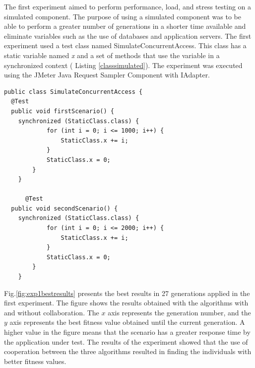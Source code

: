 \documentclass[espaco=umemeio,chapter=TITLE,twoside,openright]{abnt}
\begin{document}
The first experiment aimed to perform performance, load, and stress testing on a simulated component. The purpose of using a simulated component was to be able to perform a greater number of generations in a shorter time available and eliminate variables such as the use of databases and application servers. The first experiment used a test class  named SimulateConcurrentAccess. This class has a static variable named \textit{x} and a set of methods that use the variable in a synchronized context ( Listing \ref{classsimulated}). The experiment was executed using the JMeter Java Request Sampler Component with IAdapter.


\begin{lstlisting}[style=outline,caption={SimulateConcurrentAccess class},float,label=classsimulated]
public class SimulateConcurrentAccess {
  @Test
  public void firstScenario() {
    synchronized (StaticClass.class) {
			for (int i = 0; i <= 1000; i++) {
				StaticClass.x += i;
			}
			StaticClass.x = 0;
		}
	}

	  @Test
  public void secondScenario() {
    synchronized (StaticClass.class) {
			for (int i = 0; i <= 2000; i++) {
				StaticClass.x += i;
			}
			StaticClass.x = 0;
		}
	}
\end{lstlisting}


Fig.\ref{fig:exp1bestresults} presents the best results in 27 generations applied in the first experiment. The figure shows the results obtained with the algorithms with and without collaboration. The $x$ axis  represents the generation number, and the $y$ axis represents the best fitness value obtained until the current generation.
A higher value in the figure means that the scenario has a greater response time by the application under test. The results of the experiment showed that the use of cooperation between the three algorithms resulted in finding the individuals with better fitness values.
\end{document}
